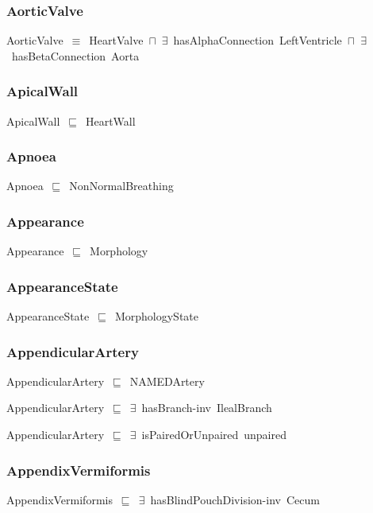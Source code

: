 \documentclass{article}
\begin{document}
\subsubsection*{AorticValve}

AorticValve~\ensuremath{\equiv}~HeartValve~\ensuremath{\sqcap}~\ensuremath{\exists}~hasAlphaConnection~LeftVentricle~\ensuremath{\sqcap}~\ensuremath{\exists}~hasBetaConnection~Aorta

\subsubsection*{ApicalWall}

ApicalWall~\ensuremath{\sqsubseteq}~HeartWall~

\subsubsection*{Apnoea}

Apnoea~\ensuremath{\sqsubseteq}~NonNormalBreathing~

\subsubsection*{Appearance}

Appearance~\ensuremath{\sqsubseteq}~Morphology~

\subsubsection*{AppearanceState}

AppearanceState~\ensuremath{\sqsubseteq}~MorphologyState~

\subsubsection*{AppendicularArtery}

AppendicularArtery~\ensuremath{\sqsubseteq}~NAMEDArtery~

AppendicularArtery~\ensuremath{\sqsubseteq}~\ensuremath{\exists}~hasBranch-inv~IlealBranch~

AppendicularArtery~\ensuremath{\sqsubseteq}~\ensuremath{\exists}~isPairedOrUnpaired~unpaired~

\subsubsection*{AppendixVermiformis}

AppendixVermiformis~\ensuremath{\sqsubseteq}~\ensuremath{\exists}~hasBlindPouchDivision-inv~Cecum~
\end{document}
